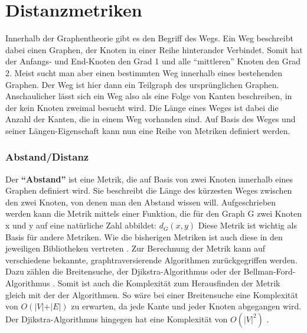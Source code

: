 \documentclass[a4paper,12pt,ngerman,chapterprefix=false,listof=totoc,bibliography=totoc]{scrreprt}
\begin{document}
\section{Distanzmetriken}
{
Innerhalb der Graphentheorie gibt es den Begriff des Wegs. Ein Weg beschreibt dabei einen Graphen, der Knoten in einer Reihe hinterander Verbindet. Somit hat der Anfangs- und End-Knoten den Grad 1 und alle "`mittleren"' Knoten den Grad 2. Meist sucht man aber einen bestimmten Weg innerhalb eines bestehenden Graphen. Der Weg ist hier dann ein Teilgraph des ursprünglichen Graphen. Anschaulicher lässt sich ein Weg also als eine Folge von Kanten beschreiben, in der kein Knoten zweimal besucht wird. Die Länge eines Weges ist dabei die Anzahl der Kanten, die in einem Weg vorhanden sind. \cite{diestel_graphentheorie_2000} Auf Basis des Weges und seiner Längen-Eigenschaft kann nun eine Reihe von Metriken definiert werden.
\subsubsection*{Abstand/Distanz}
{
Der \textbf{"`Abstand"'} ist eine Metrik, die auf Basis von zwei Knoten innerhalb eines Graphen definiert wird. Sie beschreibt die Länge des kürzesten Weges zwischen den zwei Knoten, von denen man den Abstand wissen will. Aufgeschrieben werden kann die Metrik mittels einer Funktion, die für den Graph G zwei Knoten x und y auf eine natürliche Zahl abbildet: \(d_G (x,y)\) \cite{diestel_graphentheorie_2000} Diese Metrik ist wichtig als Basis für andere Metriken. Wie die bisherigen Metriken ist auch diese in den jeweiligen Bibliotheken vertreten \cite{sagemath_graph_2020,matlab_shortest_2020,wolfram_graph_2020}. Zur Berechnung der Metrik kann auf verschiedene bekannte, graphtraversierende Algorithmen zurückgegriffen werden. Dazu zählen die Breitensuche, der Djikstra-Algorithmus oder der Bellman-Ford-Algorithmus \cite{sagemath_graph_2020}. Somit ist auch die Komplexität zum Herausfinden der Metrik gleich mit der der Algorithmen. So wäre bei einer Breitensuche eine Komplexität von \(O(\vert V\vert +\vert E\vert)\) zu erwarten, da jede Kante und jeder Knoten abgegangen wird. Der Djikstra-Algorithmus hingegen hat eine Komplexität von \(O(\vert V\vert ^2)\) \cite{jungnickel_graphs_2013}.
}
}
\end{document}
